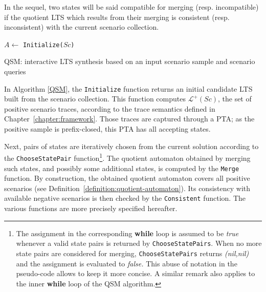 In the sequel, two states will be said compatible for merging (resp. incompatible) if the quotient LTS which results from their merging is consistent (resp. inconsistent) with the current scenario collection.

\begin{algorithm}
{
$A \leftarrow $ {\tt Initialize($Sc$)}\\
}
\vspace{0.2cm}
\caption{\textsc{QSM}: interactive LTS synthesis based on an input scenario sample and scenario queries\label{QSM}}
\end{algorithm}

In Algorithm \ref{QSM}, the \texttt{Initialize} function returns an initial candidate LTS built from the scenario collection. This function computes $\mathcal{L}^+(Sc)$, the set of positive scenario traces, according to the trace semantics defined in Chapter~\ref{chapter:framework}. Those traces are captured through a PTA; as the positive sample is prefix-closed, this PTA has all accepting states.

Next, pairs of states are iteratively chosen from the current solution according to the \texttt{ChooseStatePair} function\footnote{The assignment in the corresponding \textbf{while} loop is assumed to be \textit{true} whenever a valid state pairs is returned by \texttt{ChooseStatePairs}. When no more state pairs are considered for merging, \texttt{ChooseStatePairs} returns \textit{(nil,nil)} and the assignment is evaluated to \textit{false.} This abuse of notation in the pseudo-code allows to keep it more concise. A similar remark also applies to the inner \textbf{while} loop of the \textsc{QSM} algorithm.}. The quotient automaton obtained by merging such states, and possibly some additional states, is computed by the \texttt{Merge} function. By construction, the obtained quotient automaton covers all positive scenarios (see Definition~\ref{definition:quotient-automaton}). Its consistency with available negative scenarios is then checked by the \texttt{Consistent} function. The various functions are more precisely specified hereafter.

